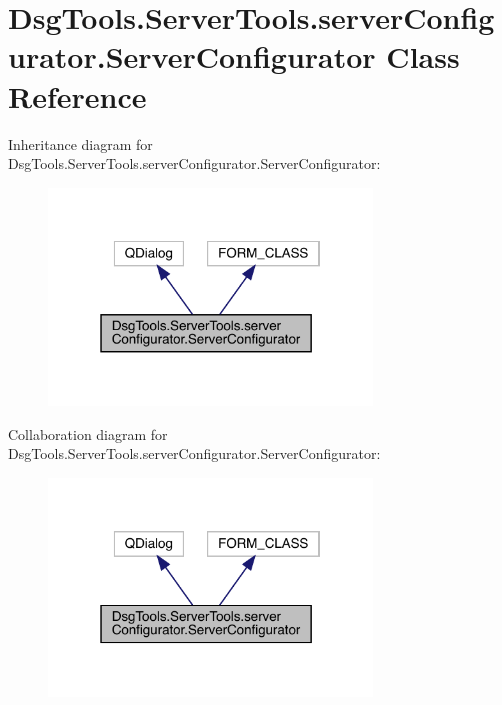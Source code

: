 \hypertarget{class_dsg_tools_1_1_server_tools_1_1server_configurator_1_1_server_configurator}{}\section{Dsg\+Tools.\+Server\+Tools.\+server\+Configurator.\+Server\+Configurator Class Reference}
\label{class_dsg_tools_1_1_server_tools_1_1server_configurator_1_1_server_configurator}


Inheritance diagram for Dsg\+Tools.\+Server\+Tools.\+server\+Configurator.\+Server\+Configurator\+:
\nopagebreak
\begin{figure}[H]
\begin{center}
\leavevmode
\includegraphics[width=244pt]{class_dsg_tools_1_1_server_tools_1_1server_configurator_1_1_server_configurator__inherit__graph}
\end{center}
\end{figure}


Collaboration diagram for Dsg\+Tools.\+Server\+Tools.\+server\+Configurator.\+Server\+Configurator\+:
\nopagebreak
\begin{figure}[H]
\begin{center}
\leavevmode
\includegraphics[width=244pt]{class_dsg_tools_1_1_server_tools_1_1server_configurator_1_1_server_configurator__coll__graph}
\end{center}
\end{figure}
